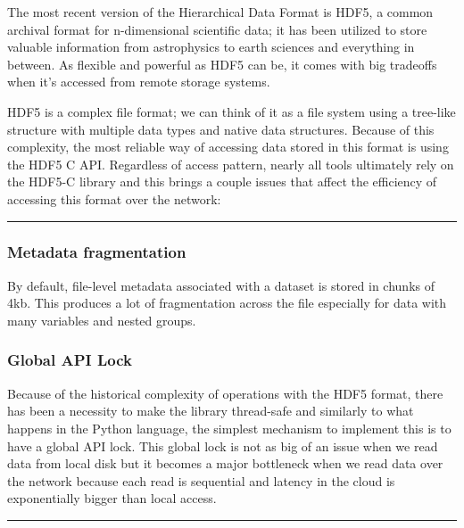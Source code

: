 \documentclass[
]{agujournal2019}
\begin{document}
The most recent version of the Hierarchical Data Format is HDF5, a
common archival format for n-dimensional scientific data; it has been
utilized to store valuable information from astrophysics to earth
sciences and everything in between. As flexible and powerful as HDF5 can
be, it comes with big tradeoffs when it's accessed from remote storage
systems.

HDF5 is a complex file format; we can think of it as a file system using
a tree-like structure with multiple data types and native data
structures. Because of this complexity, the most reliable way of
accessing data stored in this format is using the HDF5 C API. Regardless
of access pattern, nearly all tools ultimately rely on the HDF5-C
library and this brings a couple issues that affect the efficiency of
accessing this format over the network:

\begin{center}\rule{0.5\linewidth}{0.5pt}\end{center}

\subsubsection{\texorpdfstring{\textbf{Metadata
fragmentation}}{Metadata fragmentation}}\label{metadata-fragmentation}

By default, file-level metadata associated with a dataset is stored in
chunks of 4kb. This produces a lot of fragmentation across the file
especially for data with many variables and nested groups.

\subsubsection{\texorpdfstring{\textbf{Global API
Lock}}{Global API Lock}}\label{global-api-lock}

Because of the historical complexity of operations with the HDF5 format,
there has been a necessity to make the library thread-safe and similarly
to what happens in the Python language, the simplest mechanism to
implement this is to have a global API lock. This global lock is not as
big of an issue when we read data from local disk but it becomes a major
bottleneck when we read data over the network because each read is
sequential and latency in the cloud is exponentially bigger than local
access.

\begin{center}\rule{0.5\linewidth}{0.5pt}\end{center}
\end{document}

